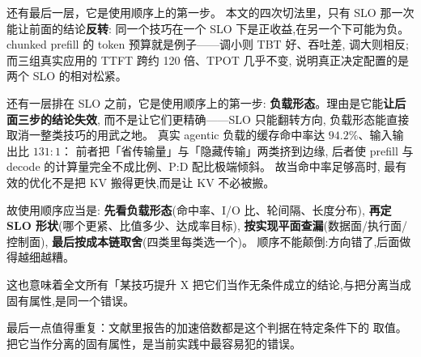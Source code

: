 还有最后一层，它是使用顺序上的第一步。
本文的四次切法里，只有 SLO 那一次能让前面的结论\textbf{反转}:
同一个技巧在一个 SLO 下是正收益,在另一个下可能为负。
chunked prefill 的 token 预算就是例子——调小则 TBT 好、吞吐差,
调大则相反;而三组真实应用的 TTFT 跨约 120 倍、TPOT 几乎不变,
说明真正决定配置的是两个 SLO 的相对松紧。

还有一层排在 SLO 之前，它是使用顺序上的第一步:
\textbf{负载形态}。理由是它能\textbf{让后面三步的结论失效},
而不是让它们更精确——SLO 只能翻转方向,
负载形态能直接取消一整类技巧的用武之地。
真实 agentic 负载的缓存命中率达 $94.2\%$、输入输出比 $131:1$：
前者把「省传输量」与「隐藏传输」两类挤到边缘,
后者使 prefill 与 decode 的计算量完全不成比例、P:D 配比极端倾斜。
故当命中率足够高时,
最有效的优化不是把 KV 搬得更快,而是让 KV 不必被搬。

故使用顺序应当是:
\textbf{先看负载形态}(命中率、I/O 比、轮间隔、长度分布),
\textbf{再定 SLO 形状}(哪个更紧、比值多少、达成率目标),
\textbf{按实现平面查漏}(数据面/执行面/控制面),
\textbf{最后按成本链取舍}(四类里每类选一个)。
顺序不能颠倒:方向错了,后面做得越细越糟。

这也意味着全文所有「某技巧提升 X%
把它们当作无条件成立的结论,与把分离当成固有属性,是同一个错误。

最后一点值得重复：文献里报告的加速倍数都是这个判据在特定条件下的
取值。把它当作分离的固有属性，是当前实践中最容易犯的错误。
